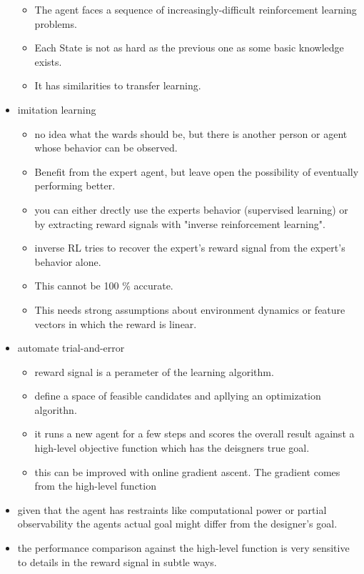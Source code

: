 \begin{itemize}[noitemsep,nolistsep]
\begin{itemize}[noitemsep,nolistsep]
		\item The agent faces a sequence of increasingly-difficult reinforcement learning problems.
		\item Each State is not as hard as the previous one as some basic knowledge exists. 
		\item It has similarities to transfer learning.
	\end{itemize}
	\item imitation learning
	\begin{itemize}[noitemsep,nolistsep]
		\item no idea what the wards should be, but there is another person or agent whose behavior can be observed.
		\item Benefit from the expert agent, but leave open the possibility of eventually performing better.
		\item you can either drectly use the experts behavior (supervised learning) or by extracting reward signals with "inverse reinforcement learning".
		\item inverse RL tries to recover the expert's reward signal from the expert's behavior alone.
		\item This cannot be 100 \% accurate.
		\item This needs strong assumptions about environment dynamics or feature vectors in which the reward is linear.
	\end{itemize}
	\item automate trial-and-error
	\begin{itemize}[noitemsep,nolistsep]
		\item reward signal is a perameter of the learning algorithm.
		\item define a space of feasible candidates and apllying an optimization algorithn.
		\item it runs a new agent for a few steps and scores the overall result against a high-level objective function which has the deisgners true goal.
		\item this can be improved with online gradient ascent. The gradient comes from the high-level function
	\end{itemize}
	\item given that the agent has restraints like computational power or partial observability the agents actual goal might differ from the designer's goal.
	\item the performance comparison against the high-level function is very sensitive to details in the reward signal in subtle ways.
\end{itemize}

